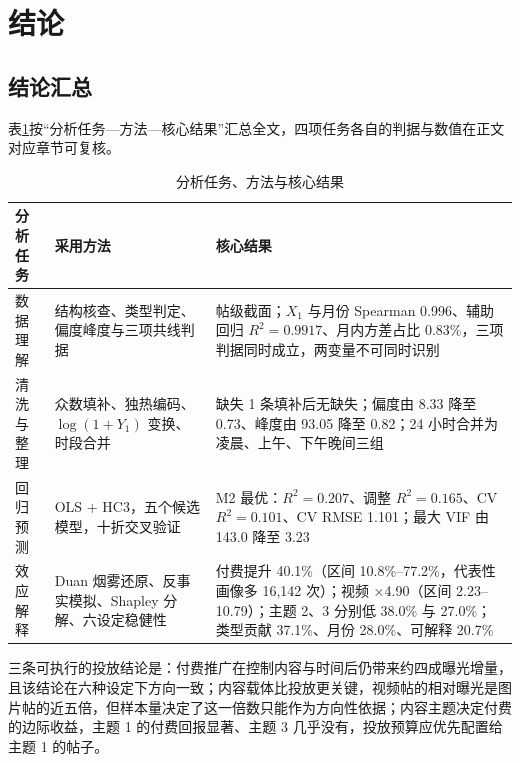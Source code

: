 \section{结论}

\subsection{结论汇总}

表\ref{tab:summary}按“分析任务—方法—核心结果”汇总全文，四项任务各自的判据与数值在正文对应章节可复核。

\begin{table}[htbp]
  \centering
  \caption{分析任务、方法与核心结果}
  \label{tab:summary}
  \setlength{\tabcolsep}{4pt}\renewcommand{\arraystretch}{1.05}
  \begin{tabular}{>{\centering\arraybackslash}p{}>{\raggedright\arraybackslash}p{}>{\raggedright\arraybackslash}p{}}
    \toprule
    分析任务 & 采用方法 & 核心结果 \\
    \midrule
    数据理解 & 结构核查、类型判定、偏度峰度与三项共线判据 & 帖级截面；$X_1$ 与月份 Spearman 0.996、辅助回归 $R^2=0.9917$、月内方差占比 0.83\%，三项判据同时成立，两变量不可同时识别 \\
    清洗与整理 & 众数填补、独热编码、$\log(1+Y_1)$ 变换、时段合并 & 缺失 1 条填补后无缺失；偏度由 8.33 降至 0.73、峰度由 93.05 降至 0.82；24 小时合并为凌晨、上午、下午晚间三组 \\
    回归预测 & OLS + HC3，五个候选模型，十折交叉验证 & M2 最优：$R^2=0.207$、调整 $R^2=0.165$、CV $R^2=0.101$、CV RMSE 1.101；最大 VIF 由 143.0 降至 3.23 \\
    效应解释 & Duan 烟雾还原、反事实模拟、Shapley 分解、六设定稳健性 & 付费提升 40.1\%（区间 10.8\%--77.2\%，代表性画像多 16,142 次）；视频 ×4.90（区间 2.23--10.79）；主题 2、3 分别低 38.0\% 与 27.0\%；类型贡献 37.1\%、月份 28.0\%、可解释 20.7\% \\
    \bottomrule
  \end{tabular}
\end{table}

三条可执行的投放结论是：付费推广在控制内容与时间后仍带来约四成曝光增量，且该结论在六种设定下方向一致；内容载体比投放更关键，视频帖的相对曝光是图片帖的近五倍，但样本量决定了这一倍数只能作为方向性依据；内容主题决定付费的边际收益，主题 1 的付费回报显著、主题 3 几乎没有，投放预算应优先配置给主题 1 的帖子。

